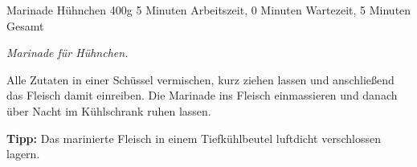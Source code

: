 \begin{recipe}{Marinade Hühnchen} {400g} {5 Minuten Arbeitszeit, 0 Minuten Wartezeit, 5 Minuten Gesamt}

  \freeform{}\textit{Marinade für Hühnchen.}


  Alle Zutaten in einer Schüssel vermischen, kurz ziehen lassen und anschließend das Fleisch damit einreiben.
  Die Marinade ins Fleisch einmassieren und danach über Nacht im Kühlschrank ruhen lassen.

  \freeform{}\hrulefill{}

  \freeform{}\textbf{Tipp:}
  Das marinierte Fleisch in einem Tiefkühlbeutel luftdicht verschlossen lagern.

\end{recipe}
